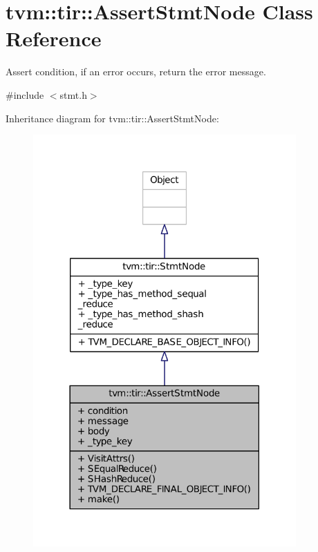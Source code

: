 \hypertarget{classtvm_1_1tir_1_1AssertStmtNode}{}\section{tvm\+:\+:tir\+:\+:Assert\+Stmt\+Node Class Reference}
\label{classtvm_1_1tir_1_1AssertStmtNode}


Assert condition, if an error occurs, return the error message.  




{\ttfamily \#include $<$stmt.\+h$>$}



Inheritance diagram for tvm\+:\+:tir\+:\+:Assert\+Stmt\+Node\+:
\nopagebreak
\begin{figure}[H]
\begin{center}
\leavevmode
\includegraphics[width=285pt]{classtvm_1_1tir_1_1AssertStmtNode__inherit__graph}
\end{center}
\end{figure}


